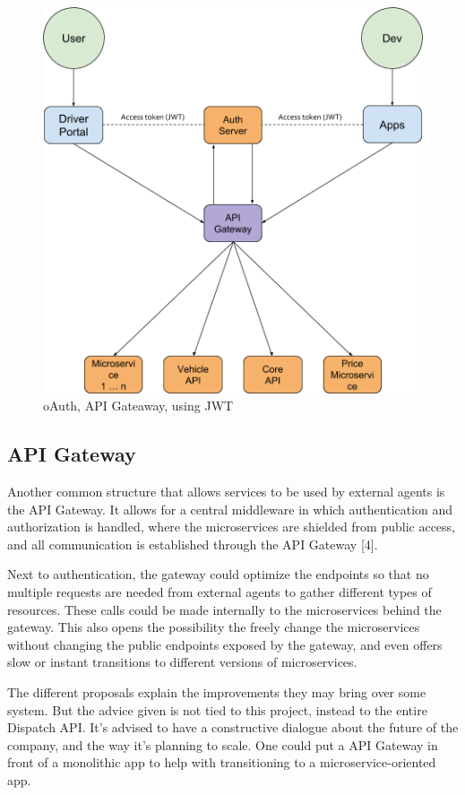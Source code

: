 \begin{figure}[ht!]
	\centering
	\includegraphics[width=.7\textwidth]{OAuth}
	\caption[Architecture]{oAuth, API Gateaway, using JWT}
	\label{fig:oAuth}
\end{figure}
\clearpage

\subsection{API Gateway}

Another common structure that allows services to be used by external agents is the API Gateway. It allows for a central middleware in which authentication and authorization is handled, where the microservices are shielded from public access, and all communication is established through the API Gateway [4].

Next to authentication, the gateway could optimize the endpoints so that no multiple requests are needed from external agents to gather different types of resources. These calls could be made internally to the microservices behind the gateway. This also opens the possibility the freely change the microservices without changing the public endpoints exposed by the gateway, and even offers slow or instant transitions to different versions of microservices.

The different proposals explain the improvements they may bring over some system. But the advice given is not tied to this project, instead to the entire Dispatch API. It’s advised to have a constructive dialogue about the future of the company, and the way it’s planning to scale. One could put a API Gateway in front of a monolithic app to help with transitioning to a microservice-oriented app.

